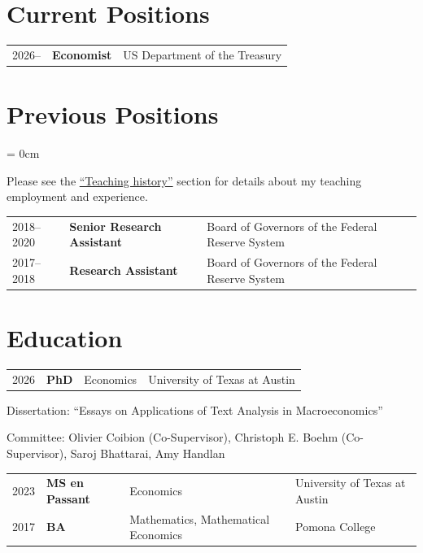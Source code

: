 \documentclass[a4paper, 10pt]{article}
\begin{document}
  \maketitle
  \thispagestyle{firststyle}
  \section{Current Positions}
  \begin{tabular}{lll}
    2026-- & \textbf{Economist} & US Department of the Treasury\\
  \end{tabular}
  
  \section{Previous Positions}
  \begin{compactitem}\parskip = 0cm
    \item Please see the {\hypersetup{linkcolor = black}\hyperref[sec:teaching_history]{``Teaching history''}} section for details about my teaching employment and experience.
  \end{compactitem}
  \vspace{1em}
  \begin{tabular}{lll}
    2018--2020 & \textbf{Senior Research Assistant} & Board of Governors of the Federal Reserve System\\
    2017--2018 & \textbf{Research Assistant} & Board of Governors of the Federal Reserve System
  \end{tabular}
  
  \section{Education}
  \begin{tabular}{p{0.7cm} p{2.2cm} p{3.6cm} p{4.1cm}}
    2026 & \textbf{PhD} & Economics & University of Texas at Austin
  \end{tabular}
  \begin{compactitem}
    \item Dissertation: ``Essays on Applications of Text Analysis in Macroeconomics''
    \item Committee: Olivier Coibion (Co-Supervisor), Christoph E. Boehm (Co-Supervisor), Saroj Bhattarai, Amy Handlan
  \end{compactitem}
  \vspace{1em}
  \begin{tabular}{p{0.7cm} p{2.2cm} p{3.6cm} p{4.1cm}}
    2023 & \textbf{MS en Passant} & Economics & University of Texas at Austin\\
    2017 & \textbf{BA} & Mathematics, \newline Mathematical Economics & Pomona College
  \end{tabular}
\end{document}
